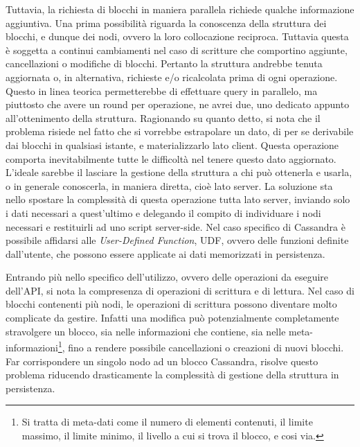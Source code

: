 		Tuttavia, la richiesta di blocchi in maniera parallela richiede qualche informazione aggiuntiva. Una prima possibilità riguarda la conoscenza della struttura dei blocchi, e dunque dei nodi, ovvero la loro collocazione reciproca. Tuttavia questa è soggetta a continui cambiamenti nel caso di scritture che comportino aggiunte, cancellazioni o modifiche di blocchi. Pertanto la struttura andrebbe tenuta aggiornata o, in alternativa, richieste e/o ricalcolata prima di ogni operazione. Questo in linea teorica permetterebbe di effettuare query in parallelo, ma piuttosto che avere un round per operazione, ne avrei due, uno dedicato appunto all'ottenimento della struttura.
		Ragionando su quanto detto, si nota che il problema risiede nel fatto che si vorrebbe estrapolare un dato, di per se derivabile dai blocchi in qualsiasi istante, e materializzarlo lato client. Questa operazione comporta inevitabilmente tutte le difficoltà nel tenere questo dato aggiornato. L'ideale sarebbe il lasciare la gestione della struttura a chi può ottenerla e usarla, o in generale conoscerla, in maniera diretta, cioè lato server.
		La soluzione sta nello spostare la complessità di questa operazione tutta lato server, inviando solo i dati necessari a quest'ultimo e delegando il compito di individuare i nodi necessari e restituirli ad uno script server-side. Nel caso specifico di Cassandra è possibile affidarsi alle \textit{User-Defined Function}, UDF, ovvero delle funzioni definite dall'utente, che possono essere applicate ai dati memorizzati in persistenza.
		
		Entrando più nello specifico dell'utilizzo, ovvero delle operazioni da eseguire dell'API, si nota la compresenza di operazioni di scrittura e di lettura. Nel caso di blocchi contenenti più nodi, le operazioni di scrittura possono diventare molto complicate da gestire. Infatti una modifica può potenzialmente completamente stravolgere un blocco, sia nelle informazioni che contiene, sia nelle meta-informazioni\footnote{Si tratta di meta-dati come il numero di elementi contenuti, il limite massimo, il limite minimo, il livello a cui si trova il blocco, e cosi via.}, fino a rendere possibile cancellazioni o creazioni di nuovi blocchi. Far corrispondere un singolo nodo ad un blocco Cassandra, risolve questo problema riducendo drasticamente la complessità di gestione della struttura in persistenza.
		
